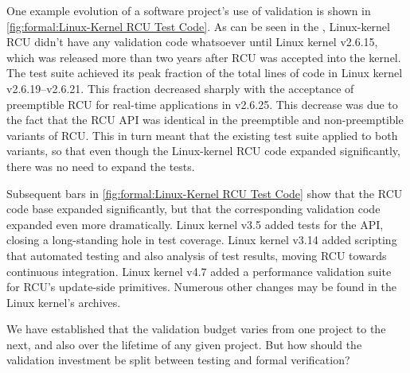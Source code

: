 
One example evolution of a software project's use of validation is
shown in
\cref{fig:formal:Linux-Kernel RCU Test Code}.
As can be seen in the ,
Linux-kernel RCU didn't have any validation code whatsoever until Linux
kernel v2.6.15, which was released more than two years after RCU was
accepted into the kernel.
The test suite achieved its peak fraction of the total lines of code
in Linux kernel v2.6.19--v2.6.21.
This fraction decreased sharply with the acceptance of preemptible RCU
for real-time applications in v2.6.25.
This decrease was due to the fact that the RCU API was identical
in the preemptible and non-preemptible variants of RCU.
This in turn meant that the existing test suite applied to both variants,
so that even though the Linux-kernel RCU code expanded significantly,
there was no need to expand the tests.

Subsequent bars in \cref{fig:formal:Linux-Kernel RCU Test Code} show
that the RCU code base expanded significantly, but that the
corresponding validation code expanded even more dramatically.
Linux kernel v3.5 added tests for the  API, closing
a long-standing hole in test coverage.
Linux kernel v3.14 added scripting that automated testing and also
analysis of test results, moving RCU towards continuous integration.
Linux kernel v4.7 added a performance validation suite for RCU's update-side
primitives.
Numerous other changes may be found in the Linux kernel's  archives.

We have established that the validation budget varies from one project
to the next, and also over the lifetime of any given project.
But how should the validation investment be split between testing and
formal verification?

